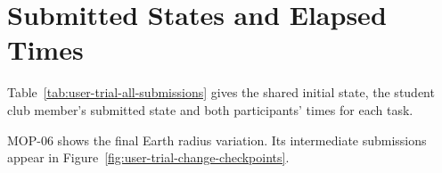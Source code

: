\section{Submitted States and Elapsed Times}

Table~\ref{tab:user-trial-all-submissions} gives the shared initial state, the student club member's submitted state and both participants' times for each task.

\begingroup
\renewcommand{\UserTrialImageMaxHeight}{170pt}
\begin{table}
\centering
\caption[User test submissions.]{User test submissions. Screenshots show the shared initial states and the student club member's submissions. Times are in seconds.}
\label{tab:user-trial-all-submissions}
\begin{UserTrialEvidence}
\UserTrialFirstRow
\midrule
{}
\end{UserTrialEvidence}
\end{table}
\clearpage

\begin{table}
\ContinuedFloat
\centering
\caption[]{User test submissions (continued). Times are in seconds.}
\begin{UserTrialEvidence}
\midrule
{}
\end{UserTrialEvidence}
\end{table}
\clearpage

\begin{table}
\ContinuedFloat
\centering
\caption[]{User test submissions (continued). Times are in seconds.}
\begin{UserTrialEvidence}
\midrule
{}
\midrule
{}
\end{UserTrialEvidence}
\par\smallskip\footnotesize
MOP-06 shows the final Earth radius variation. Its intermediate submissions appear in Figure~\ref{fig:user-trial-change-checkpoints}.
\end{table}
\clearpage

\begin{table}
\ContinuedFloat
\centering
\caption[]{User test submissions (continued). Times are in seconds.}
\begin{UserTrialEvidence}
\end{UserTrialEvidence}
\end{table}
\clearpage

